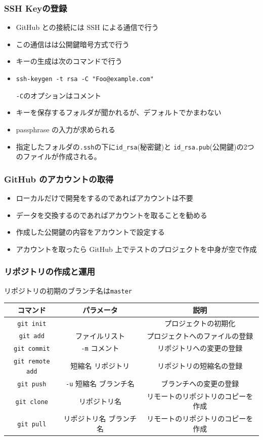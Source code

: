 \begin{frame}[containsverbatim]
 \frametitle{SSH Keyの登録}
 \begin{itemize}
  \item GitHub との接続には SSH による通信で行う
  \item この通信はは公開鍵暗号方式で行う
  \item キーの生成は次のコマンドで行う
  \item \Verb+ssh-keygen -t rsa -C "Foo@example.com"+

\Verb+-C+のオプションはコメント 
  \item キーを保存するフォルダが聞かれるが、デフォルトでかまわない
  \item passphrase の入力が求められる
  \item 指定したフォルダの\Verb+.ssh+の下に\Verb+id_rsa+(秘密鍵)と
\Verb+id_rsa.pub+(公開鍵)の2つのファイルが作成される。 
 \end{itemize}
\end{frame}
\begin{frame}[containsverbatim]
 \frametitle{GitHub のアカウントの取得}
 \begin{itemize}
  \item ローカルだけで開発をするのであればアカウントは不要
  \item データを交換するのであればアカウントを取ることを勧める
  \item 作成した公開鍵の内容をアカウントで設定する
  \item アカウントを取ったら GitHub 上でテストのプロジェクトを中身が空で作成
 \end{itemize}
\end{frame}
\begin{frame}[containsverbatim]
 \frametitle{リポジトリの作成と運用}
リポジトリの初期のブランチ名は\Verb+master+

 \footnotesize
\begin{tabular}{|c|c|c|}\hline
コマンド&パラメータ&説明\\\hline
\Verb+git init+ & &プロジェクトの初期化\\\hline
\Verb+git add+ & ファイルリスト&プロジェクトへのファイルの登録 \\\hline
\Verb+git commit+& \Verb+-m+ コメント& リポジトリへの変更の登録\\ \hline
\Verb+git remote add+ &短縮名 リポジトリ & リポジトリの短縮名の登録\\
 \hline
\Verb+git push+ &\Verb+-u+ 短縮名 ブランチ名 &ブランチへの変更の登録 \\ \hline
\Verb+git clone+ &リポジトリ名 &リモートのリポジトリのコピーを作成\\ \hline
\Verb+git pull+ &リポジトリ名 ブランチ名 &リモートのリポジトリのコピーを作成\\ \hline
\end{tabular}
\end{frame}
